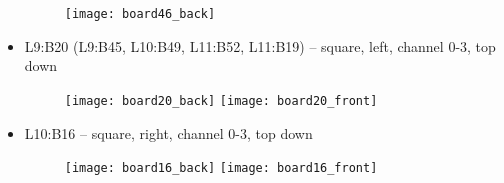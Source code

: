 \documentclass{report}
\begin{document}
\begin{itemize}
\begin{figure}[h]
	    \centering
	    \texttt{[image: board46\_back]}
	\end{figure}
    \item L9:B20 (L9:B45, L10:B49, L11:B52, L11:B19) -- square, left, channel 0-3, top down
	\begin{figure}[h]
	    \centering
	    \texttt{[image: board20\_back]}
	    \texttt{[image: board20\_front]}
	\end{figure}
    \item L10:B16 -- square, right, channel 0-3, top down
	\begin{figure}[h]
	    \centering
	    \texttt{[image: board16\_back]}
	    \texttt{[image: board16\_front]}
	\end{figure}
\end{itemize}
\end{document}
